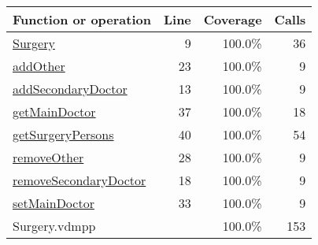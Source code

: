 \begin{longtable}{|l|r|r|r|}
\hline
Function or operation & Line & Coverage & Calls \\
\hline
\hline
\hyperref[Surgery:9]{Surgery} & 9&100.0\% & 36 \\
\hline
\hyperref[addOther:23]{addOther} & 23&100.0\% & 9 \\
\hline
\hyperref[addSecondaryDoctor:13]{addSecondaryDoctor} & 13&100.0\% & 9 \\
\hline
\hyperref[getMainDoctor:37]{getMainDoctor} & 37&100.0\% & 18 \\
\hline
\hyperref[getSurgeryPersons:40]{getSurgeryPersons} & 40&100.0\% & 54 \\
\hline
\hyperref[removeOther:28]{removeOther} & 28&100.0\% & 9 \\
\hline
\hyperref[removeSecondaryDoctor:18]{removeSecondaryDoctor} & 18&100.0\% & 9 \\
\hline
\hyperref[setMainDoctor:33]{setMainDoctor} & 33&100.0\% & 9 \\
\hline
\hline
Surgery.vdmpp & & 100.0\% & 153 \\
\hline
\end{longtable}


